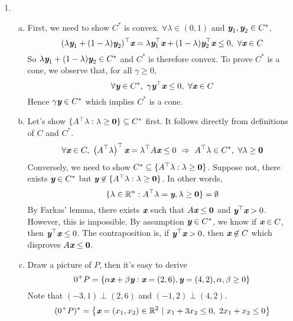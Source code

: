 \begin{enumerate}
	\newpage
	\item {}
	\begin{enumerate}[(a)]
		\item First, we need to show $C^*$ is convex. $\forall \lambda\in (0,1)$ and $\textit{\textbf{y}}_1,\textit{\textbf{y}}_2\in C^*$,\[
		(\lambda\textit{\textbf{y}}_1+(1-\lambda)\textit{\textbf{y}}_2)^\top \textit{\textbf{x}} = \lambda \textit{\textbf{y}}_1^\top \textit{\textbf{x}} + (1-\lambda) \textit{\textbf{y}}_2^\top \textit{\textbf{x}} \le 0,~\forall \textit{\textbf{x}}\in C
		\]
		So $\lambda \textit{\textbf{y}}_1+(1-\lambda)\textit{\textbf{y}}_2\in C^*$ and $C^*$ is therefore convex. To prove $C^*$ is a cone, we observe that, for all $\gamma \ge 0$, 
		\[
		\forall \textit{\textbf{y}} \in C^*,~\gamma \textit{\textbf{y}}^\top\textit{\textbf{x}} \le 0,~\forall \textit{\textbf{x}}\in C
		\] 
		Hence $\gamma\textit{\textbf{y}}\in C^*$ which implies $C^*$ is a cone.
		
		\item Let's show $\{A^\top \lambda: \lambda\ge \textbf{0}\}\subseteq C^*$ first. It follows directly from definitions of $C$ and $C^*$.
		\[
		\forall \textit{\textbf{x}} \in C,~\left(A^\top \lambda\right)^\top \textit{\textbf{x}}  = \lambda^\top A\textit{\textbf{x}} \le 0~\Rightarrow~ A^\top\lambda \in C^*,~\forall \lambda\ge \textbf{0}
		\] 
		Conversely, we need to show $C^*\subseteq \{A^\top\lambda: \lambda\ge \textbf{0}\}$. Suppose not, there exists $\textit{\textbf{y}}\in C^*$ but $\textit{\textbf{y}} \not\in \{A^\top\lambda:\lambda\ge \textbf{0}\}$. In other words,
		\[
		\{\lambda \in \mathbb{R}^n: A^\top \lambda = \textit{\textbf{y}}, \lambda\ge \textbf{0} \} = \emptyset
		\]
		By Farkas' lemma, there exists $\textit{\textbf{x}}$ such that $A\textit{\textbf{x}}\le \textbf{0}$ and $\textit{\textbf{y}}^\top \textit{\textbf{x}} >0$. However, this is impossible. By assumption $\textit{\textbf{y}} \in C^*$, we know if $\textit{\textbf{x}} \in C$, then $\textit{\textbf{y}}^\top \textit{\textbf{x}} \le 0$. The contraposition is, if $\textit{\textbf{y}}^\top \textit{\textbf{x}} >0$, then $\textit{\textbf{x}} \not \in C$ which disproves $A\textit{\textbf{x}} \le \textbf{0}$.
		
		\item Draw a picture of $P$, then it's easy to derive
		\[
		0^+P = \left\{\alpha \textit{\textbf{x}} + \beta \textit{\textbf{y}}: \textit{\textbf{x}} = (2,6), \textit{\textbf{y}} = (4,2), \alpha,\beta \ge 0  \right\}
		\]
		Note that $(-3, 1) \perp (2,6)$ and $(-1,2)\perp (4,2)$.
		\[
		(0^+P)^* = \left\{ \textit{\textbf{x}} =(x_1,x_2)\in \mathbb{R}^2 ~|~ x_1+3x_2\le 0, ~2x_1+x_2\le 0 \right\}
		\]
		
		
	\end{enumerate}
	

\end{enumerate}
